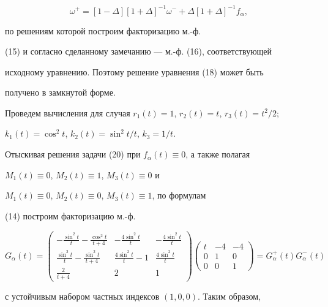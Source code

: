 \begin{examnonum}
\begin{equation}
\omega^+=[1-\Delta][1+\Delta]^{-1}\omega^-+\Delta 


[1+\Delta]^{-1}f_\alpha, 


\end{equation} 


по решениям которой построим факторизацию м.-ф. 


(15) и согласно сделанному замечанию --- м.-ф. (16), соответствующей 


исходному уравнению. Поэтому решение уравнения (18) может быть 


получено в замкнутой форме. 


 


Проведем вычисления для случая $r_1(t)=1$, $r_2(t)=t$, $r_3(t)=t^2/2$; 


$k_1(t)=\cos^2t$, $k_2(t)=\sin^2t/t$, $k_3=1/t$. 


Отыскивая решения задачи (20) при $f_\alpha(t)\equiv0$, а также полагая 


$M_1(t)\equiv0$, $M_2(t)\equiv1$, $M_3(t)\equiv0$ и 


$M_1(t)\equiv0$, $M_2(t)\equiv0$, $M_3(t)\equiv1$, по формулам 


(14) построим факторизацию м.-ф. 


$$ 


G_\alpha(t)= 


\begin{pmatrix} 


-\frac{\sin^2t}{t}-\frac{\cos^2t}{t+4} & 


-\frac{4\sin^2t}{t} & -\frac{4\sin^2t}{t} \\ 


\frac{\sin^2t}{t}-\frac{\sin^2t}{t+4} & 


\frac{4\sin^2t}{t}-1 & \frac{4\sin^2t}{t} \\ 


\frac{2}{t+4} & 2 & 1 


\end{pmatrix} 


\begin{pmatrix} 


t & -4 & -4 \\ 0 & 1 & 0 \\ 0 & 0 & 1 


\end{pmatrix} 


=G^+_\alpha(t)G^-_\alpha(t) 


$$ 


с устойчивым набором частных индексов $(1,0,0)$. Таким образом, 



\end{examnonum}
